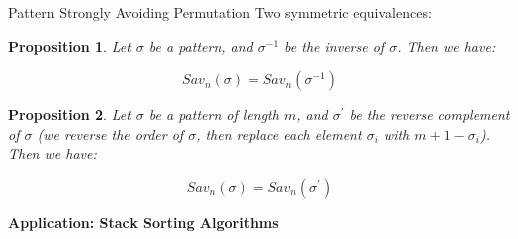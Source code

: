 \documentclass{beamer}  %
\newtheorem{prop}{Proposition}
\begin{document}
\begin{frame}{Pattern Strongly Avoiding Permutation}
Two symmetric equivalences:

\begin{prop} Let $\sigma$ be a pattern, and $\sigma^{-1}$ be the inverse of $\sigma$. Then we have:

$$Sav_n(\sigma)=Sav_n(\sigma^{-1})$$
\end{prop}

\begin{prop} Let $\sigma$ be a pattern of length $m$, and $\sigma^{'}$ be the reverse complement of $\sigma$ (we reverse the order of $\sigma$, then replace each element $\sigma_i$ with $m+1-\sigma_i$). Then we have:

$$Sav_n(\sigma)=Sav_n(\sigma^{'})$$
\end{prop}

\end{frame}

\begin{frame}
    \begin{center}
        \Huge \textbf{Application: Stack Sorting Algorithms}
    \end{center}
\end{frame}
\end{document}
